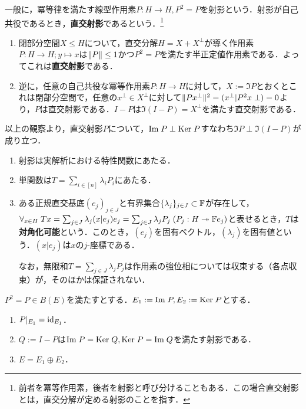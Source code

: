 \documentclass[uplatex,dvipdfmx]{jsreport}
\begin{document}
\begin{definition}
        一般に，冪等律を満たす線型作用素$P:H\to H,P^2=P$を射影という．射影が自己共役であるとき，\textbf{直交射影}であるという．\footnote{前者を冪等作用素，後者を射影と呼び分けることもある．この場合直交射影とは，直交分解が定める射影のことを指す．}
\end{definition}
\begin{example}[直交射影の直交分解による特徴付け]\mbox{}
    \begin{enumerate}
        \item 閉部分空間$X\le H$について，直交分解$H=X+X^\perp$が導く作用素$P:H\to H;y\mapsto x$は$\|P\|\le 1$かつ$P^2=P$を満たす半正定値作用素である．よってこれは\textbf{直交射影}である．
        \item 逆に，任意の自己共役な冪等作用素$P:H\to H$に対して，$X:=\Im P$とおくとこれは閉部分空間で，任意の$x^\perp\in X^\perp$に対して$\|Px^\perp\|^2=(x^\perp|P^2x\perp)=0$より，$P$は直交射影である．$I-P$は$\Im(I-P)=X^\perp$を満たす直交射影である．
    \end{enumerate}
    以上の観察より，直交射影$P$について，$\mathrm{Im}\; P\perp\mathrm{Ker}\; P$すなわち$\Im P\perp\Im(I-P)$が成り立つ．
\end{example}
\begin{remarks}[diagonalizable]\mbox{}
    \begin{enumerate}
        \item 射影は実解析における特性関数にあたる．
        \item 単関数は$T=\sum_{i\in[n]}\lambda_iP_i$にあたる．
        \item ある正規直交基底$(e_j)_{j\in J}$と有界集合$\{\lambda_j\}_{j\in J}\subset\mathbb{F}$が存在して，$\forall_{x\in H}\;Tx=\sum_{j\in J}\lambda_j(x|e_j)e_j=\sum_{j\in J}\lambda_jP_j\;(P_j:H\twoheadrightarrow\mathbb{F} e_j)$と表せるとき，$T$は\textbf{対角化可能}という．このとき，$(e_j)$を固有ベクトル，$(\lambda_j)$を固有値という．$(x|e_j)$は$x$の$j$-座標である．
        
        なお，無限和$T=\sum_{j\in J}\lambda_jP_j$は作用素の強位相については収束する（各点収束）が，そのほかは保証されない．
    \end{enumerate}
\end{remarks}

\begin{lemma}[一般の射影の性質]\label{lemma-property-of-projection}
    $P^2=P\in B(E)$を満たすとする．$E_1:=\mathrm{Im}\; P,E_2:=\mathrm{Ker}\; P$とする．
    \begin{enumerate}
        \item $P|_{E_1}=\mathrm{id}_{E_1}$．
        \item $Q:=I-P$は$\mathrm{Im}\; P=\mathrm{Ker}\; Q,\mathrm{Ker}\; P=\mathrm{Im}\; Q$を満たす射影である．
        \item $E=E_1\oplus E_2$．
    \end{enumerate}
\end{lemma}
\end{document}
